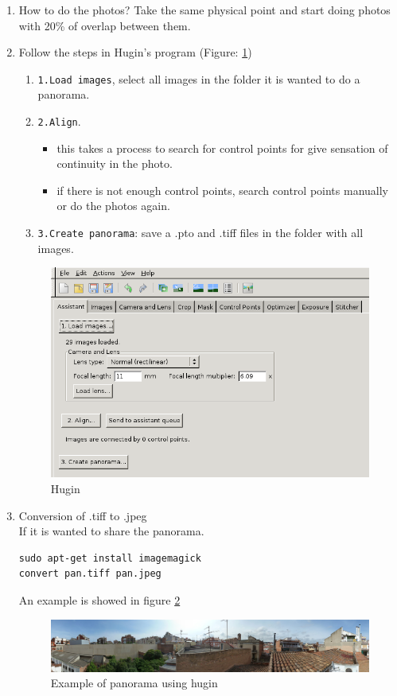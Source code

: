 \documentclass[11pt]{article}
\begin{document}
\begin{enumerate}
\item How to do the photos? Take the same physical point and start doing
photos with 20\% of overlap between them.
\item Follow the steps in Hugin's program (Figure: \ref{fig:hugin})
\begin{enumerate}
\item \texttt{1.Load images}, select all images in the folder it is wanted to
do a panorama.
\item \texttt{2.Align}.
\begin{itemize}
\item this takes a process to search for control points for give
sensation of continuity in the photo.
\item if there is not enough control points, search
control points manually or do the photos again.
\end{itemize}
\item \texttt{3.Create panorama}: save a .pto and .tiff files in the folder with
all images.
\end{enumerate}
\begin{figure}[htb]
\centering
\includegraphics[width=.9\linewidth]{./img/general/hugin.png}
\caption{\label{fig:hugin}Hugin}
\end{figure}
\item Conversion of .tiff to .jpeg \\
   If it is wanted to share the panorama.
\begin{verbatim}
sudo apt-get install imagemagick
convert pan.tiff pan.jpeg
\end{verbatim}
An example is showed in figure \ref{fig:exhugin}
\begin{figure}[htb]
\centering
\includegraphics[width=.9\linewidth]{./img/santandreudeploy/llenguadoc.jpg}
\caption{\label{fig:exhugin}Example of panorama using hugin}
\end{figure}
\end{enumerate}
\end{document}
